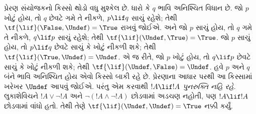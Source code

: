 પ્રેરણ સંયોજકનો કિસ્સો થોડો વધુ મુશ્કેલ છે. ધારો કે $q$ ભાવિ
અનિશ્ચિત વિધાન છે. જો $p$ ખોટું હોય, તો $q$ છેવટે ગમે તે નીકળે,
$p \lif q$ સાચું રહેશે; તેથી $\tf{\lif}(\False, \Undef) = \True$
રાખવું જોઈએ. અને જો $p$ સાચું હોય, તો $q$ ગમે તે નીકળે,
$q \lif p$ સાચું રહેશે; તેથી $\tf{\lif}(\Undef, \True) = \True$.
જો $p$ સાચું હોય, તો $p \lif q$ છેવટે સાચું કે ખોટું નીકળી શકે;
તેથી $\tf{\lif}(\True, \Undef) = \Undef$. એ જ રીતે, જો $p$
ખોટું હોય, તો $q \lif p$ છેવટે સાચું કે ખોટું નીકળી શકે; તેથી
$\tf{\lif}(\Undef, \False) = \Undef$. હવે $p$ અને $q$ બંને
ભાવિ અનિશ્ચિત હોય એવો કિસ્સો બાકી રહે છે. પ્રેરણાના આધાર પરથી
આ કિસ્સામાં ખરેખર $\Undef$ આપવું જોઈએ. પરંતુ એમ કરવાથી
$!A \lif !A$ \emph{પુનરુક્તિ નહિ રહે}. લુકાશેવિચને
$!A \lor \lnot !A$ અને $\lnot(!A \land \lnot !A)$ છોડવામાં
અડચણ નહોતી, પણ $!A \lif !A$ છોડવામાં વાંધો હતો. તેથી તેણે
$\tf{\lif}(\Undef, \Undef) = \True$ નક્કી કર્યું.

